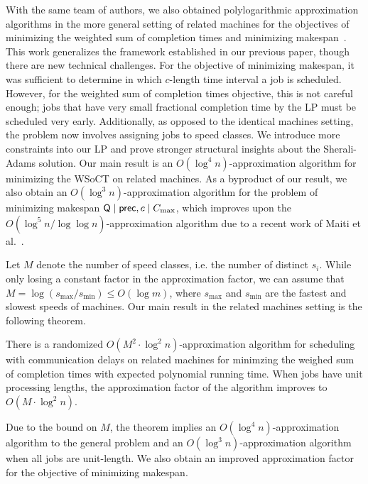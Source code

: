 With the same team of authors, we also obtained polylogarithmic approximation algorithms in the more general setting of
related machines for the objectives of minimizing the weighted sum of completion times and minimizing makespan~\cite{DaviesKRTZ21}.
This work generalizes the framework established in our previous paper, though there are new technical challenges.
For the objective of minimizing makespan, it was sufficient to determine in which $c$-length time interval a job is scheduled. 
However, for the weighted sum of completion times objective, this is not careful enough; jobs that have very small fractional completion time by the LP 
must be scheduled very early.
Additionally, as opposed to the identical machines setting, the problem now involves assigning jobs to speed classes.
We introduce more constraints into our LP and prove stronger structural insights about the Sherali-Adams solution.
Our main result is an $O(\log^4 n)$-approximation algorithm for minimizing the WSoCT on related machines.
As a byproduct of our result, we also obtain an $O(\log^3 n)$-approximation algorithm for the problem of minimizing makespan  $\mathsf{Q} \mid \mathsf{prec}, c \mid C_{\textrm{max}}$, which improves upon the $O(\log^5 n/\log \log n)$-approximation algorithm due to a recent work of  Maiti et al.~\cite{MRSSV}.


Let $M$ denote the number of speed classes, i.e. the number of distinct $s_i$.
While only losing a constant factor in the approximation factor, we can assume that $M =\log(s_{\text{max}}/s_{\text{min}})\leq O(\log m)$,
where $s_{\text{max}}$ and $s_{\text{min}}$ are the fastest and slowest speeds of machines.
Our main result in the related machines setting is the following theorem.
\begin{theorem}
There is a randomized $O(M^2 \cdot \log^2 n)$-approximation algorithm for 
scheduling with communication delays on related machines for minimzing the weighed sum of completion times with expected polynomial running time. 
When jobs have unit processing lengths, the approximation factor of the algorithm improves to  $O(M \cdot \log^2 n )$.
\end{theorem}
Due to the bound on $M$, the theorem implies an $O(\log^4 n)$-approximation algorithm to the general problem and an $O(\log^3 n)$-approximation algorithm when all jobs are unit-length.
We also obtain an improved approximation factor for the objective of minimizing makespan.


